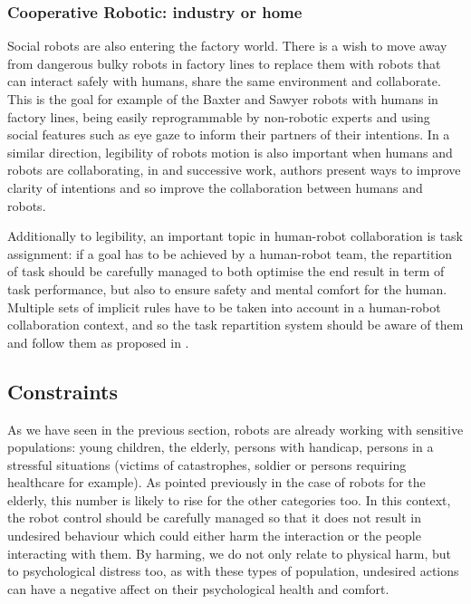 \subsubsection{Cooperative Robotic: industry or home}
	
    Social robots are also entering the factory world. There is a wish to move
    away from dangerous bulky robots in factory lines to replace them with
    robots that can interact safely with humans, share the same environment and
    collaborate. This is the goal for example of the Baxter and Sawyer robots
    with humans in factory lines, being easily reprogrammable by non-robotic
    experts and using social features such as eye gaze to inform their partners
    of their intentions. In a similar direction, legibility of robots motion is
    also important when humans and robots are collaborating, in
    \citet{dragan2013legibility} and successive work, authors present ways to
    improve clarity of intentions and so improve the collaboration between
    humans and robots.

    Additionally to legibility, an important topic in human-robot collaboration
    is task assignment: if a goal has to be achieved by a human-robot team, the
    repartition of task should be carefully managed to both optimise the end
    result in term of task performance, but also to ensure safety and mental
    comfort for the human. Multiple sets of implicit rules have to be taken into
    account in a human-robot collaboration context, and so the task repartition
    system should be aware of them and follow them as proposed in
    \citet{montreuil2007planning}.
	

\subsection{Constraints} \label{ssec:back_const}

    As we have seen in the previous section, robots are already working with
    sensitive populations: young children, the elderly, persons with handicap,
    persons in a stressful situations (victims of catastrophes, soldier or
    persons requiring healthcare for example). As pointed previously in the case
    of robots for the elderly, this number is likely to rise for the other
    categories too. In this context, the robot control should be carefully
    managed so that it does not result in undesired behaviour which could either
    harm the interaction or the people interacting with them. By harming, we do
    not only relate to physical harm, but to psychological distress too, as with
    these types of population, undesired actions can have a negative affect on
    their psychological health and comfort.

